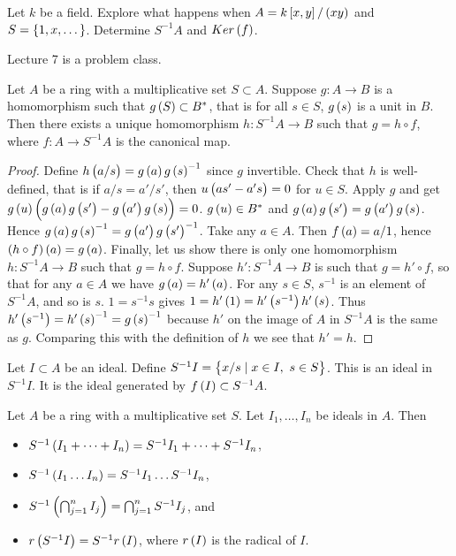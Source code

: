 \begin{example*}
Let $ k $ be a field. Explore what happens when $ A = k\sbr{x, y} / \br{xy} $ and $ S = \cbr{1, x, \dots} $. Determine $ S^{-1}A $ and $ Ker\br{f} $.
\end{example*}


Lecture 7 is a problem class.

\pagebreak


\begin{lemma}
Let $ A $ be a ring with a multiplicative set $ S \subset A $. Suppose $ g : A \to B $ is a homomorphism such that $ g\br{S} \subset B^* $, that is for all $ s \in S $, $ g\br{s} $ is a unit in $ B $. Then there exists a unique homomorphism $ h : S^{-1}A \to B $ such that $ g = h \circ f $, where $ f : A \to S^{-1}A $ is the canonical map.
\end{lemma}

\begin{proof}
Define $ h\br{a / s} = g\br{a}g\br{s}^{-1} $ since $ g $ invertible. Check that $ h $ is well-defined, that is if $ a / s = a' / s' $, then $ u\br{as' - a's} = 0 $ for $ u \in S $. Apply $ g $ and get $ g\br{u}\br{g\br{a}g\br{s'} - g\br{a'}g\br{s}} = 0 $. $ g\br{u} \in B^* $ and $ g\br{a}g\br{s'} = g\br{a'}g\br{s} $. Hence $ g\br{a}g\br{s}^{-1} = g\br{a'}g\br{s'}^{-1} $. Take any $ a \in A $. Then $ f\br{a} = a / 1 $, hence $ \br{h \circ f}\br{a} = g\br{a} $. Finally, let us show there is only one homomorphism $ h : S^{-1}A \to B $ such that $ g = h \circ f $. Suppose $ h' : S^{-1}A \to B $ is such that $ g = h' \circ f $, so that for any $ a \in A $ we have $ g\br{a} = h'\br{a} $. For any $ s \in S $, $ s^{-1} $ is an element of $ S^{-1}A $, and so is $ s $. $ 1 = s^{-1}s $ gives $ 1 = h'\br{1} = h'\br{s^{-1}}h'\br{s} $. Thus $ h'\br{s^{-1}} = h'\br{s}^{-1} = g\br{s}^{-1} $ because $ h' $ on the image of $ A $ in $ S^{-1}A $ is the same as $ g $. Comparing this with the definition of $ h $ we see that $ h' = h $.
\end{proof}

Let $ I \subset A $ be an ideal. Define $ S^{-1}I = \cbr{x / s \mid x \in I, \ s \in S} $. This is an ideal in $ S^{-1}I $. It is the ideal generated by $ f\br{I} \subset S^{-1}A $.

\begin{proposition}
Let $ A $ be a ring with a multiplicative set $ S $. Let $ I_1, \dots, I_n $ be ideals in $ A $. Then
\begin{itemize}
\item $ S^{-1}\br{I_1 + \dots + I_n} = S^{-1}I_1 + \dots + S^{-1}I_n $,
\item $ S^{-1}\br{I_1 \dots I_n} = S^{-1}I_1 \dots S^{-1}I_n $,
\item $ S^{-1}\br{\bigcap_{j = 1}^n I_j} = \bigcap_{j = 1}^n S^{-1}I_j $, and
\item $ r\br{S^{-1}I} = S^{-1}r\br{I} $, where $ r\br{I} $ is the radical of $ I $.
\end{itemize}
\end{proposition}

